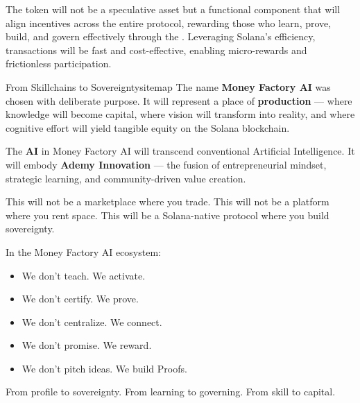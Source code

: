 The token will not be a speculative asset but a functional component that will align incentives across the entire protocol, rewarding those who learn, prove, build, and govern effectively through the . Leveraging Solana's efficiency, transactions will be fast and cost-effective, enabling micro-rewards and frictionless participation.

\begin{mfai-box}{From Skillchains to Sovereignty}{sitemap}
The name \textbf{Money Factory AI} was chosen with deliberate purpose. It will represent a place of \textbf{production} — where knowledge will become capital, where vision will transform into reality, and where cognitive effort will yield tangible equity on the Solana blockchain.

The \textbf{AI} in Money Factory AI will transcend conventional Artificial Intelligence. It will embody \textbf{Ademy Innovation} — the fusion of entrepreneurial mindset, strategic learning, and community-driven value creation.

This will not be a marketplace where you trade. This will not be a platform where you rent space. This will be a Solana-native protocol where you build sovereignty.

In the Money Factory AI ecosystem:
\begin{itemize}
    \item We don't teach. We activate.
    \item We don't certify. We prove.
    \item We don't centralize. We connect.
    \item We don't promise. We reward.
    \item We don't pitch ideas. We build Proofs.
\end{itemize}

From profile to sovereignty. From learning to governing. From skill to capital.
\end{mfai-box}

\newpage
